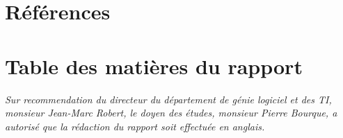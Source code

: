 \documentclass[a4paper, oneside, 12pt, titlepage]{article}
\begin{document}
\section{Références}


\renewcommand*{\refname}{\vspace*{-1em}}\vspace*{-1em}

\nocite{*}



\section{Table des matières du rapport}

\emph{Sur recommendation du directeur du département de génie logiciel et des TI, monsieur Jean-Marc
Robert, le doyen des études, monsieur Pierre Bourque, a autorisé que la rédaction du rapport soit
effectuée en anglais.}
\end{document}
